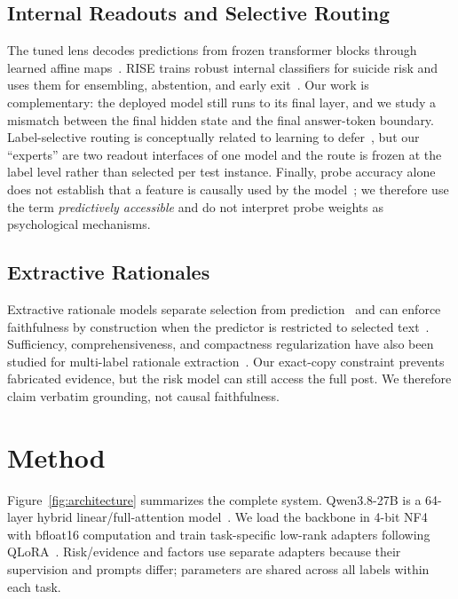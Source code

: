 \documentclass[conference]{IEEEtran}
\begin{document}
\subsection{Internal Readouts and Selective Routing}
The tuned lens decodes predictions from frozen transformer blocks through learned affine maps~\cite{belrose2023tunedlens}. RISE trains robust internal classifiers for suicide risk and uses them for ensembling, abstention, and early exit~\cite{soun2024rise}. Our work is complementary: the deployed model still runs to its final layer, and we study a mismatch between the final hidden state and the final answer-token boundary. Label-selective routing is conceptually related to learning to defer~\cite{mozannar2020defer}, but our ``experts'' are two readout interfaces of one model and the route is frozen at the label level rather than selected per test instance. Finally, probe accuracy alone does not establish that a feature is causally used by the model~\cite{hewitt2019probes,belinkov2022probing}; we therefore use the term \emph{predictively accessible} and do not interpret probe weights as psychological mechanisms.

\subsection{Extractive Rationales}
Extractive rationale models separate selection from prediction~\cite{lei2016rationalizing} and can enforce faithfulness by construction when the predictor is restricted to selected text~\cite{jain2020fresh}. Sufficiency, comprehensiveness, and compactness regularization have also been studied for multi-label rationale extraction~\cite{chalkidis2021rationale}. Our exact-copy constraint prevents fabricated evidence, but the risk model can still access the full post. We therefore claim verbatim grounding, not causal faithfulness.

\section{Method}
Figure~\ref{fig:architecture} summarizes the complete system. Qwen3.8-27B is a 64-layer hybrid linear/full-attention model~\cite{qwen38modelcard}. We load the backbone in 4-bit NF4 with bfloat16 computation and train task-specific low-rank adapters following QLoRA~\cite{dettmers2023qlora}. Risk/evidence and factors use separate adapters because their supervision and prompts differ; parameters are shared across all labels within each task.
\end{document}
